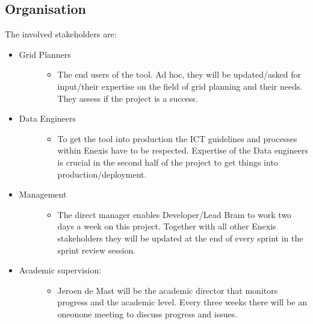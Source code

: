 \documentclass[letterpaper,10pt,english]{sphinxmanual}
\begin{document}
\subsection{Organisation}
\label{\detokenize{business_understanding:organisation}}
The involved stakeholders are:
\begin{itemize}
\item {} \begin{description}
\item[{Grid Planners}] \leavevmode\begin{itemize}
\item {} 
The end users of the tool. Ad hoc, they will be updated/asked for input/their expertise on the field of grid planning and their needs. They assess if the project is a success.

\end{itemize}

\end{description}

\item {} \begin{description}
\item[{Data Engineers}] \leavevmode\begin{itemize}
\item {} 
To get the tool into production the ICT guidelines and processes within Enexis have to be respected. Expertise of the Data engineers is crucial in the second half of the project to get things into production/deployment.

\end{itemize}

\end{description}

\item {} \begin{description}
\item[{Management}] \leavevmode\begin{itemize}
\item {} 
The direct manager enables Developer/Lead Bram to work two days a week on this project. Together with all other Enexis stakeholders they will be updated at the end of every sprint in the sprint review session.

\end{itemize}

\end{description}

\item {} \begin{description}
\item[{Academic supervision:}] \leavevmode\begin{itemize}
\item {} 
Jeroen de Mast will be the academic director that monitors progress and the academic level. Every three weeks there will be an one\sphinxhyphen{}on\sphinxhyphen{}one meeting to discuss progress and issues.


\end{itemize}
\end{description}
\end{itemize}
\end{document}
